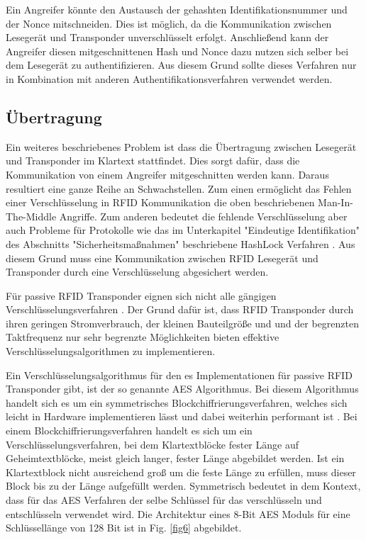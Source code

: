 \documentclass[conference]{IEEEtran}
\begin{document}
Ein Angreifer könnte den Austausch der gehashten Identifikationsnummer und der Nonce mitschneiden. Dies ist möglich, da die Kommunikation zwischen Lesegerät und Transponder unverschlüsselt erfolgt. Anschließend kann der Angreifer diesen mitgeschnittenen Hash und Nonce dazu nutzen sich selber bei dem Lesegerät zu authentifizieren. Aus diesem Grund sollte dieses Verfahren nur in Kombination mit anderen Authentifikationsverfahren verwendet werden.

\subsection{Übertragung}
Ein weiteres beschriebenes Problem ist dass die Übertragung zwischen Lesegerät und Transponder im Klartext stattfindet. Dies sorgt dafür, dass die Kommunikation von einem Angreifer mitgeschnitten werden kann. Daraus resultiert eine ganze Reihe an Schwachstellen. Zum einen ermöglicht das Fehlen einer Verschlüsselung in RFID Kommunikation die oben beschriebenen Man-In-The-Middle Angriffe. Zum anderen bedeutet die fehlende Verschlüsselung aber auch Probleme für Protokolle wie das im Unterkapitel "Eindeutige Identifikation" des Abschnitts "Sicherheitsmaßnahmen" beschriebene HashLock Verfahren \cite{b9}. Aus diesem Grund muss eine Kommunikation zwischen RFID Lesegerät und Transponder durch eine Verschlüsselung abgesichert werden. 

Für passive RFID Transponder eignen sich nicht alle gängigen Verschlüsselungsverfahren \cite{b9}. Der Grund dafür ist, dass RFID Transponder durch ihren geringen Stromverbrauch, der kleinen Bauteilgröße und und  der begrenzten Taktfrequenz nur sehr begrenzte Möglichkeiten bieten effektive Verschlüsselungsalgorithmen zu implementieren.

Ein Verschlüsselungsalgorithmus für den es Implementationen für passive RFID Transponder gibt, ist der so genannte AES Algorithmus. Bei diesem Algorithmus handelt sich es um ein symmetrisches Blockchiffrierungsverfahren, welches sich leicht in Hardware implementieren lässt und dabei weiterhin performant ist \cite{b9}. Bei einem Blockchiffrierungsverfahren handelt es sich um ein Verschlüsselungsverfahren, bei dem Klartextblöcke fester Länge auf Geheimtextblöcke, meist gleich langer, fester Länge abgebildet werden. Ist ein Klartextblock nicht ausreichend groß um die feste Länge zu erfüllen, muss dieser Block bis zu der Länge aufgefüllt werden. Symmetrisch bedeutet in dem Kontext, dass für das AES Verfahren der selbe Schlüssel für das verschlüsseln und entschlüsseln verwendet wird. Die Architektur eines 8-Bit AES Moduls für eine Schlüssellänge von 128 Bit ist in Fig. \ref{fig6} abgebildet.
\end{document}
